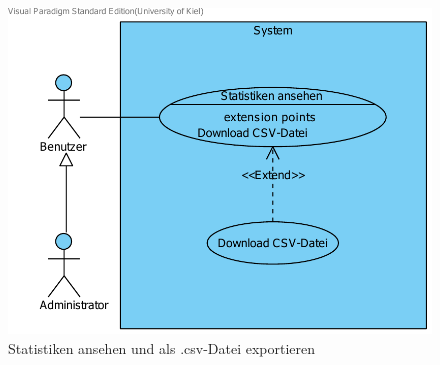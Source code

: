 \documentclass[10pt,a4paper]{article}
\begin{document}
        \begin{figure}[H]
	  \includegraphics[width=\linewidth]{gfx/webseite/statistikfunktion.pdf}
          \caption{Statistiken ansehen und als .csv-Datei exportieren}
	\end{figure}
        
\end{document}
